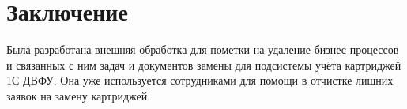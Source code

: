 \section{Заключение}
    Была разработана внешняя обработка для пометки на удаление бизнес-процессов и связанных с ним задач и документов замены для подсистемы учёта картриджей 1С ДВФУ. Она уже используется сотрудниками для помощи в отчистке лишних заявок на замену картриджей.